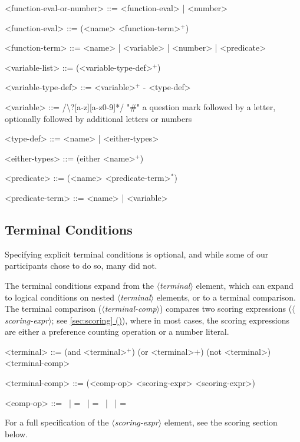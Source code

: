 \documentclass{article}
\newcommand{\dsl}[1]{{\it $\langle$#1$\rangle$}}
\newcommand*{\fullref}[1]{\hyperref[{#1}]{\autoref*{#1} (\nameref*{#1})}} %
\begin{document}
\begin{grammar}
<function-eval-or-number> ::= <function-eval> | <number>

<function-eval> ::= (<name> <function-term>$^+$)

<function-term> ::= <name> | <variable> | <number> | <predicate>

<variable-list> ::= (<variable-type-def>$^+$)

<variable-type-def> ::= <variable>$^+$ - <type-def>

<variable> ::= /\textbackslash?[a-z][a-z0-9]*/  "#" a question mark followed by a letter, optionally followed by additional letters or numbers

<type-def> ::= <name> | <either-types>

<either-types> ::= (either <name>$^+$)

<predicate> ::= (<name> <predicate-term>$^*$)

<predicate-term> ::= <name> | <variable>


\end{grammar}



\subsection{Terminal Conditions} \label{sec:terminal}
Specifying explicit terminal conditions is optional, and while some of our participants chose to do so, many did not. 

The terminal conditions expand from the \dsl{terminal} element, which can expand to logical conditions on nested \dsl{terminal} elements, or to a terminal comparison. 
The terminal comparison (\dsl{terminal-comp}) compares two scoring expressions (\dsl{scoring-expr}; see \fullref{sec:scoring}), where in most cases, the scoring expressions are either a preference counting operation or a number literal. 
        
\begin{grammar}
<terminal> ::= (and <terminal>$^+$) \alt
        (or <terminal>$+$) \alt
        (not <terminal>) \alt
        <terminal-comp>

<terminal-comp> ::= (<comp-op> <scoring-expr> <scoring-expr>) 
    
    <comp-op> ::=  \textlangle \ | \textlangle = \ | = \ | \textrangle \ | \textrangle =



\end{grammar}
For a full specification of the \dsl{scoring-expr} element, see the scoring section below.
        
\end{document}
